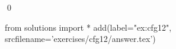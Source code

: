 
\begin{ex} 
  \label{ex:cfg12}
  
  \qed
\end{ex} 
\begin{python0}
from solutions import *
add(label="ex:cfg12",
    srcfilename='exercises/cfg12/answer.tex') 
\end{python0}
